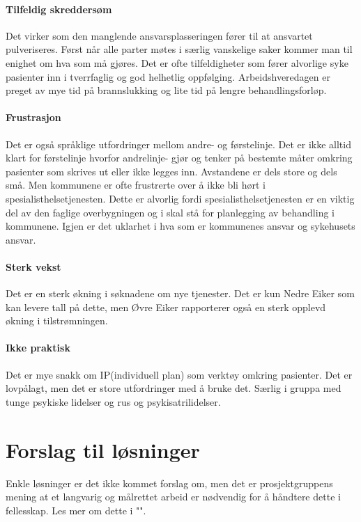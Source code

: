 \documentclass[11pt]{report} %
\begin{document}
                  \paragraph{Tilfeldig skreddersøm\\} 
                    Det virker som den manglende ansvarsplasseringen fører til at ansvartet pulveriseres. Først når alle parter møtes i særlig vanskelige saker kommer man til enighet om hva som må gjøres. Det er ofte tilfeldigheter som fører alvorlige syke pasienter inn i tverrfaglig og god helhetlig oppfølging. Arbeidshveredagen er preget av mye tid på brannslukking og lite tid på lengre behandlingsforløp.\\
                  \paragraph{Frustrasjon\\}  
                    Det er også språklige utfordringer mellom andre- og førstelinje. Det er ikke alltid klart for førstelinje hvorfor andrelinje- gjør og tenker på bestemte måter omkring pasienter som skrives ut eller ikke legges inn. Avstandene er dels store og dels små. Men kommunene er ofte frustrerte over å ikke bli hørt i spesialisthelsetjenesten. Dette er alvorlig fordi spesialisthelsetjenesten er en viktig del av den faglige overbygningen og i skal stå for planlegging av behandling i kommunene. Igjen er det uklarhet i hva som er kommunenes ansvar og sykehusets ansvar.\\
                  \paragraph{Sterk vekst\\}  
                    Det er en sterk økning i søknadene om nye tjenester. Det er kun Nedre Eiker som kan levere tall på dette, men Øvre Eiker rapporterer også en sterk opplevd økning i tilstrømningen.\\
                  \paragraph{Ikke praktisk\\}  
                    Det er mye snakk om IP(individuell plan) som verktøy omkring pasienter. Det er lovpålagt, men det er store utfordringer med å bruke det. Særlig i gruppa med tunge psykiske lidelser og rus og psykisatrilidelser.
                \section{Forslag til løsninger}\label{chap:disk_losn}
                  Enkle løsninger er det ikke kommet forslag om, men det er prosjektgruppens mening at et langvarig og målrettet arbeid er nødvendig for å håndtere dette i fellesskap. Les mer om dette i "".
    
\end{document}
